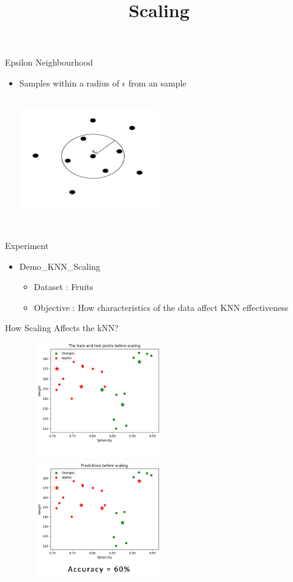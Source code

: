 \documentclass[aspectratio=169,14pt,usenames,dvipsnames]{beamer}
\begin{document}
\begin{frame}{Epsilon Neighbourhood}
\begin{itemize}
\item Samples within a radius of $\epsilon$  from  an sample \\
\centering
\includegraphics[width=6cm , height=6cm]{Images/knn13.png}
\end{itemize}
\end{frame}


\begin{frame}{Experiment}
\begin{itemize}
\item {Demo\_KNN\_Scaling}
	\begin{itemize}
		\item Dataset : Fruits 
		\item Objective : How characteristics of the data affect KNN effectiveness 
	\end{itemize}
\end{itemize}
\end{frame}

{\1
\begin{frame}
	\title{Scaling}
\titlepage
\end{frame}
}

\begin{frame}[t]{How Scaling Affects the kNN?}
\begin{figure}
\includegraphics[width=6cm, height=5cm]{Images/13knn.png}
\includegraphics[width=6cm, height=5cm]{Images/14knn.png}
\end{figure}
\end{frame}
\end{document}
